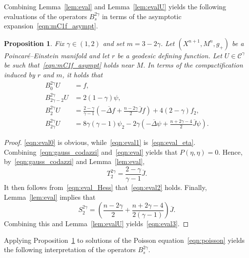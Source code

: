 \documentclass{amsart}
\newtheorem{prop}[thm]{Proposition}
\theoremstyle{definition}
\theoremstyle{remark}
\numberwithin{equation}{section}
\begin{document}
Combining Lemma~\ref{lem:eval} and Lemma~\ref{lem:evalU} yields the following evaluations of the operators $B_{s}^{2\gamma}$ in terms of the asymptotic expansion~\eqref{eqn:mC1f_asympt}.

\begin{prop}
\label{prop:eval}
 Fix $\gamma\in(1,2)$ and set $m=3-2\gamma$.  Let $(X^{n+1},M^n,g_+)$ be a Poincar\'e--Einstein manifold and let $r$ be a geodesic defining function.  Let $U\in{\mathcal{C}}^\gamma$ be such that~\eqref{eqn:mC1f_asympt} holds near $M$.  In terms of the compactification induced by $r$ and $m$, it holds that
 \begin{align}
  \label{eqn:eval0} B_{0}^{2\gamma}U & = f, \\
  \label{eqn:eval1} B_{2\gamma-2}^{2\gamma}U & = 2(1-\gamma)\psi, \\
  \label{eqn:eval2} B_{2}^{2\gamma}U & = \frac{2-\gamma}{\gamma-1}\left(-{\overline{\Delta}} f + \frac{n-2\gamma}{2}{\overline{J}} f\right) + 4(2-\gamma)f_2 , \\
  \label{eqn:eval3} B_{2\gamma}^{2\gamma}U & = 8\gamma(\gamma-1)\psi_2 - 2\gamma\left(-{\overline{\Delta}}\psi + \frac{n+2\gamma-4}{2}{\overline{J}}\psi\right) .
 \end{align}
\end{prop}

\begin{proof}
 \eqref{eqn:eval0} is obvious, while~\eqref{eqn:eval1} is~\eqref{eqn:eval_eta}.  Combining~\eqref{eqn:gauss_codazzi} and~\eqref{eqn:eval} yields that $P(\eta,\eta)=0$.  Hence, by~\eqref{eqn:gauss_codazzi} and Lemma~\ref{lem:eval},
 \begin{equation}
  \label{eqn:asymptotic_T2}
  T_2^{2\gamma} = \frac{2-\gamma}{\gamma-1}{\overline{J}} .
 \end{equation}
 It then follows from~\eqref{eqn:eval_Hess} that~\eqref{eqn:eval2} holds.  Finally, Lemma~\ref{lem:eval} implies that
 \[ S_2^{2\gamma} = \left(\frac{n-2\gamma}{2} + \frac{n+2\gamma-4}{2(\gamma-1)}\right){\overline{J}} . \]
 Combining this and Lemma~\ref{lem:evalU} yields~\eqref{eqn:eval3}.
\end{proof}

Applying Proposition~\ref{prop:eval} to solutions of the Poisson equation~\eqref{eqn:poisson} yields the following interpretation of the operators $B_{s}^{2\gamma}$.
\end{document}
